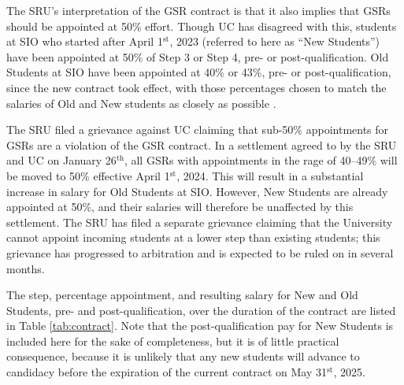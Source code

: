 \documentclass{article}
\begin{document}
The SRU's interpretation of the GSR contract is that it also implies that GSRs should be appointed at 50\% effort. Though UC has disagreed with this, students at SIO who started after April 1$^\text{st}$, 2023 (referred to here as ``New Students'') have been appointed at 50\% of Step 3 or Step 4, pre- or post-qualification. Old Students at SIO have been appointed at 40\% or 43\%, pre- or post-qualification, since the new contract took effect, with those percentages chosen to match the salaries of Old and New students as closely as possible \citep{salary_implementation_email}.

The SRU filed a grievance against UC claiming that sub-50\% appointments for GSRs are a violation of the GSR contract. In a settlement agreed to by the SRU and UC on January 26$^\text{th}$, all GSRs with appointments in the rage of 40--49\% will be moved to 50\% effective April 1$^\text{st}$, 2024. This will result in a substantial increase in salary for Old Students at SIO. However, New Students are already appointed at 50\%, and their salaries will therefore be unaffected by this settlement. The SRU has filed a separate grievance claiming that the University cannot appoint incoming students at a lower step than existing students; this grievance has progressed to arbitration and is expected to be ruled on in several months.

The step, percentage appointment, and resulting salary for New and Old Students, pre- and post-qualification, over the duration of the contract are listed in Table \ref{tab:contract}. Note that the post-qualification pay for New Students is included here for the sake of completeness, but it is of little practical consequence, because it is unlikely that any new students will advance to candidacy before the expiration of the current contract on May 31$^\text{st}$, 2025.
\end{document}
